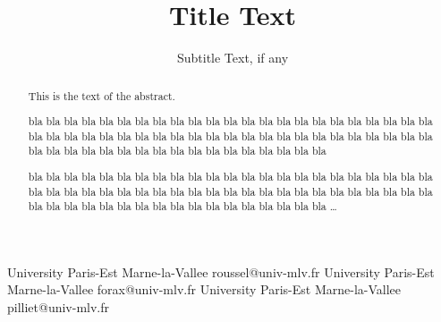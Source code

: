 \documentclass{sigplanconf}
\begin{document}
\setlength{\pdfpageheight}{\paperheight}
\setlength{\pdfpagewidth}{\paperwidth}






\title{Title Text}
\subtitle{Subtitle Text, if any}

           {University Paris-Est Marne-la-Vallee}
           {roussel@univ-mlv.fr}
           {University Paris-Est Marne-la-Vallee}
           {forax@univ-mlv.fr}
           {University Paris-Est Marne-la-Vallee}
           {pilliet@univ-mlv.fr}

\maketitle

\begin{abstract}
This is the text of the abstract.

bla bla bla bla bla bla bla bla bla
bla bla bla bla bla bla bla bla bla
bla bla bla bla bla bla bla bla bla
bla bla bla bla bla bla bla bla bla
bla bla bla bla bla bla bla bla bla
bla bla bla bla bla bla bla bla bla
bla bla bla bla bla bla bla bla bla

bla bla bla bla bla bla bla bla bla
bla bla bla bla bla bla bla bla bla
bla bla bla bla bla bla bla bla bla
bla bla bla bla bla bla bla bla bla
bla bla bla bla bla bla bla bla bla
bla bla bla bla bla bla bla bla bla
bla bla bla bla bla bla bla bla bla
\dots
\end{abstract}

\end{document}
